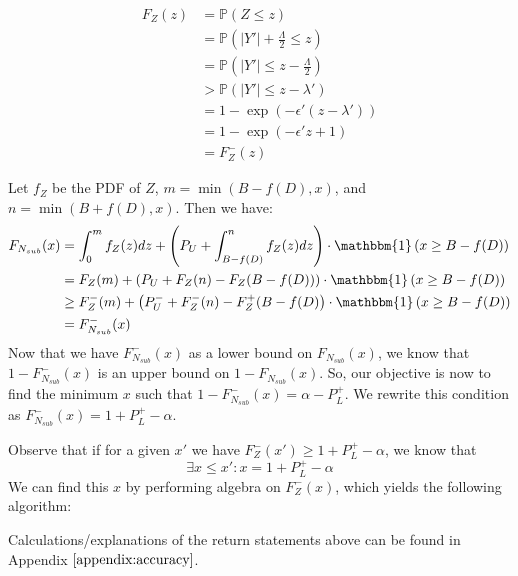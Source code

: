 \documentclass[11pt]{scrartcl} %
\begin{document}
\begin{align}
	F_{Z}(z) &= \mathbb{P}(Z \leq z) \nonumber \\
			 &= \mathbb{P}\left( \vert Y' \vert + \frac{\Lambda}{2} \leq z \right) \nonumber \\
			 &= \mathbb{P} \left( \vert Y' \vert \leq z - \frac{\Lambda}{2} \right) \nonumber \\
			 &> \mathbb{P} \left( \vert Y' \vert \leq z - \lambda' \right) \nonumber \\
			 &= 1 - \exp\left( -\epsilon'(z - \lambda') \right) \nonumber \\
			 &= 1 - \exp\left( -\epsilon'z + 1 \right) \nonumber \\
			 &= F_{Z}^{-}(z) \nonumber
\end{align}

Let $f_Z$ be the PDF of $Z$, $m = \min\left(B-f(D),x\right)$, and $n = \min\left(B+f(D),x\right)$.  Then we have:
\begin{align}
	F_{N_{sub}}(x) &= \int_{0}^{m} f_{Z}(z)dz + \left( P_{U} + \int_{B - f(D)}^{n} f_{Z}(z)dz \right) \cdot \mathbbm{1}\left(x \geq B - f(D)\right) \nonumber \\
				   &= F_{Z}(m) + \left( P_{U}  + F_{Z}(n) - F_{Z}(B - f(D)) \right) \cdot \mathbbm{1}\left( x \geq B - f(D) \right)   \nonumber \\
				   &\geq F_{Z}^{-}(m) + \left( P_{U}^{-} + F_{Z}^{-}(n) - F_{Z}^{+}(B - f(D) \right) \cdot \mathbbm{1}\left(x \geq B - f(D)\right) \nonumber \\
				   &= F_{N_{sub}}^{-}(x) \nonumber
\end{align}
Now that we have $F_{N_{sub}}^{-}(x)$ as a lower bound on $F_{N_{sub}}(x)$, we know that
$1 - F_{N_{sub}}^{-}(x)$ is an upper bound on $1 - F_{N_{sub}}(x)$.
So, our objective is now to find the minimum $x$ such that $1 - F_{N_{sub}}^{-}(x) = \alpha - P_{L}^{+}$.
We rewrite this condition as $F_{N_{sub}}^{-}(x) = 1 + P_{L}^{+} - \alpha$. \newline

Observe that if for a given $x'$ we have
$F_{Z}^{-}(x') \geq 1 + P_{L}^{+} - \alpha$, we know that
\[ \exists x \leq x': x = 1 + P_{L}^{+} - \alpha \]
We can find this $x$ by performing algebra on $F_{Z}^{-}(x)$, which yields the following algorithm:

\begin{algorithm}
	\label{GetAccuracy}
	\begin{algorithmic}
				\State{}
				\State{}
				\State{}
			\Else{}
				\State{}
			\EndIf
		\EndFunction
	\end{algorithmic}
\end{algorithm}
Calculations/explanations of the return statements above can be found in Appendix $\autoref{appendix:accuracy}$. \newline
\end{document}

